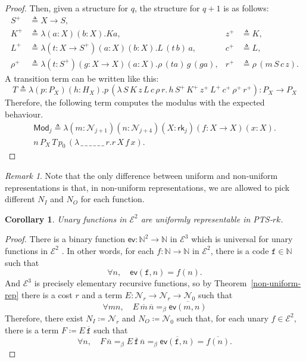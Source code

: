 \documentclass{article}
\newtheorem{corollary}{Corollary}
\theoremstyle{definition}
\theoremstyle{remark}
\newtheorem*{remark}{Remark}
\begin{document}
\begin{proof}
    Then, given a structure for $q$, the structure for
    $q+1$ is as follows:
    \begin{align*}
        S^+&\triangleq X\to S,\\
        K^+&\triangleq\lambda(a:X)(b:X).Ka,&
        z^+&\triangleq K,\\
        L^+&\triangleq\lambda(t:X\to S^+)(a:X)(b:X).
            L\,(t\,b)\,a,&
        c^+&\triangleq L,\\
        \rho^+&\triangleq\lambda(t:S^+)(g:X\to X)(a:X).
            \rho\,(ta)\,g\,(ga),&
        r^+&\triangleq\rho\,(m\,S\,c\,z).
    \end{align*}
    A transition term can be written like this:
    \[
        T\triangleq\lambda(p:P_X)(h:H_X).
            p\,(\lambda\,S\,K\,z\,L\,c\,\rho\,r.\,
            h\,S^+\,K^+\,z^+\,L^+\,c^+\,\rho^+\,r^+)
        :P_X\to P_X
    \]
    Therefore, the following term computes the modulus
    with the expected behaviour.
    \begin{multline*}
        \mathsf{Mod}_j\triangleq\lambda
        (m:\mathcal{N}_{j+1})(n:\mathcal{N}_{j+4})
        (X:\mathsf{rk}_j)(f:X\to X)(x:X).\\
            n\,P_X\,T\,p_0\,
            (\lambda\,\_\,\_\,\_\,\_\,\_\,\_\,r.
                r\,X\,f\,x).
    \end{multline*}
\end{proof}

\begin{remark}
    Note that the only difference between uniform and
    non-uniform representations is that, in non-uniform
    representations, we are allowed to pick different
    $N_I$ and $N_O$ for each function.
\end{remark}

\begin{corollary}
    Unary functions in $\mathcal{E}^2$ are uniformly
    representable in PTS-$rk$.
\end{corollary}
\begin{proof}
    There is a binary function $\mathsf{ev}:
    \mathbb{N}^2\to\mathbb{N}$ in $\mathcal{E}^3$ which
    is universal for unary functions in $\mathcal{E}^2$
    \cite[Section~5, p.~873, footnote~5]{Skordev2008}.
    In other words, for each $f:\mathbb{N}\to
    \mathbb{N}$ in $\mathcal{E}^2$, there is a code
    $\mathtt{f}\in\mathbb{N}$ such that
    \[
        \forall n,\quad\mathsf{ev}(\mathtt{f},n)
        =f(n).
    \]
    And $\mathcal{E}^3$ is precisely elementary
    recursive functions, so by
    Theorem~\ref{non-uniform-rep} there is a cost $r$
    and a term
    $E:\mathcal{N}_r\to\mathcal{N}_r\to\mathcal{N}_0$
    such that
    \[
        \forall m n,\quad E\,\overline{m}\,\overline{n}
        =_\beta\overline{\mathsf{ev}(m,n)}
    \]
    Therefore, there exist $N_I\coloneqq\mathcal{N}_r$
    and $N_O\coloneqq\mathcal{N}_0$ such that, for each
    unary $f\in\mathcal{E}^2$, there is a term
    $F\coloneqq E\,\overline{\mathtt{f}}$ such that
    \[
        \forall n,\quad F\,\overline{n}=_\beta
        E\,\overline{\mathtt{f}}\,\overline{n}=_\beta
        \overline{\mathsf{ev}(\mathtt{f},n)}=
        \overline{f(n)}.
    \]
\end{proof}
\end{document}
